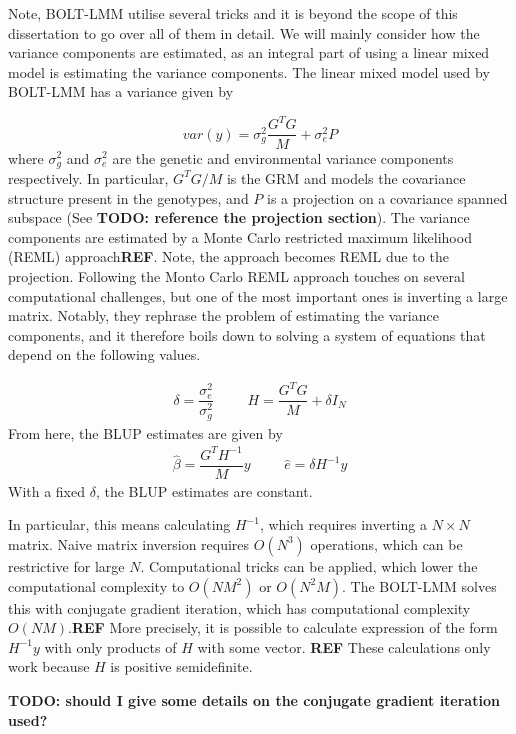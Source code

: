 Note, BOLT-LMM utilise several tricks and it is beyond the scope of this dissertation to go over all of them in detail. We will mainly consider how the variance components are estimated, as an integral part of using a linear mixed model is estimating the variance components. The linear mixed model used by BOLT-LMM has a variance given by

\begin{equation}
var(y) = \sigma_g^2 \dfrac{G^TG}{M} + \sigma_e^2 P
\end{equation}
where $ \sigma_g^2 $ and $ \sigma_e^2 $ are the genetic and environmental variance components respectively. In particular, $ G^TG/M $ is the GRM and models the covariance structure present in the genotypes, and $ P $ is a projection on a covariance spanned subspace (See \textbf{TODO: reference the projection section}). The variance components are estimated by a Monte Carlo restricted maximum likelihood (REML) approach\textbf{REF}. Note, the approach becomes REML due to the projection. Following the Monto Carlo REML approach touches on several computational challenges, but one of the most important ones is inverting a large matrix. Notably, they rephrase the problem of estimating the variance components, and it therefore boils down to solving a system of equations that depend on the following values.

\begin{align}
\delta = \dfrac{\sigma_e^2}{\sigma_g^2} & & & H = \dfrac{G^T G}{M} + \delta I_N
\end{align}
From here, the BLUP estimates are given by
\begin{align}
\hat{\beta} = \dfrac{G^T H^{-1}}{M} y & & & \hat{e} = \delta H^{-1}y
\end{align}
With a fixed $ \delta $, the BLUP estimates are constant. 


In particular, this means calculating $ H^{-1}$, which requires inverting a $ N \times N $ matrix. Naive matrix inversion requires $ O(N^3) $ operations, which can be restrictive for large $ N $. Computational tricks can be applied, which lower the computational complexity to $ O(NM^2) $ or $ O(N^2M) $. The BOLT-LMM solves this with conjugate gradient iteration, which has computational complexity $ O(NM) $.\textbf{REF}
More precisely, it is possible to calculate expression of the form $ H^{-1}y $ with only products of $ H $ with some vector. \textbf{REF} These calculations only work because $ H $ is positive semidefinite.

\textbf{TODO: should I give some details on the conjugate gradient iteration used?}



